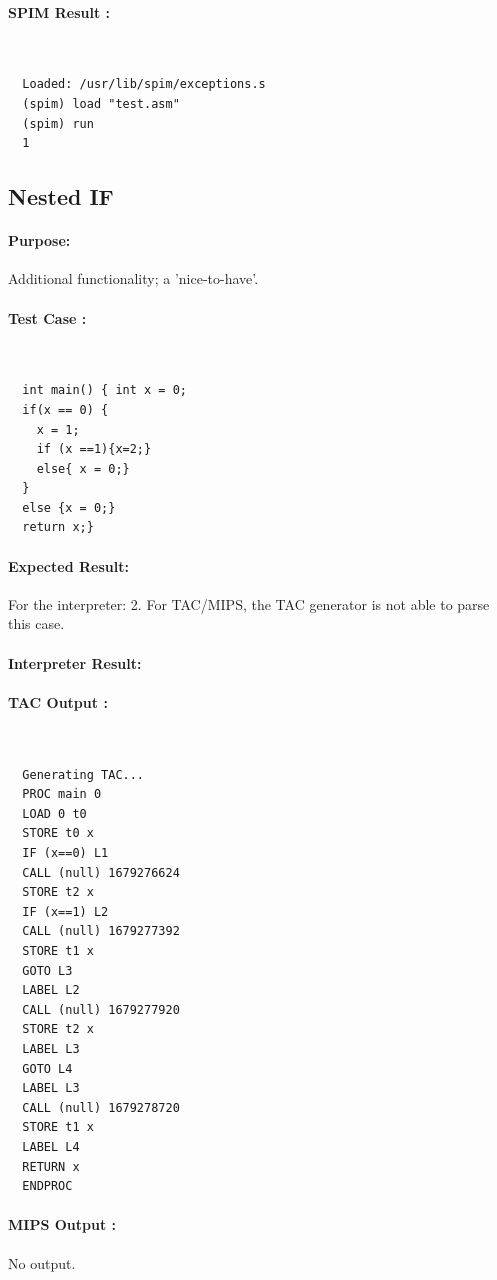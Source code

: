 \documentclass[12pt]{article}
\begin{document}
\paragraph{SPIM Result :}~\\
\begin{lstlisting}
  Loaded: /usr/lib/spim/exceptions.s
  (spim) load "test.asm"
  (spim) run
  1
\end{lstlisting}
\subsection{Nested IF}
\paragraph{Purpose:} Additional functionality; a 'nice-to-have'. 
\paragraph{Test Case :}~\\
\begin{lstlisting}
  int main() { int x = 0; 
  if(x == 0) { 
    x = 1;
    if (x ==1){x=2;} 
    else{ x = 0;}
  }
  else {x = 0;} 
  return x;}
\end{lstlisting}
\paragraph{Expected Result:} For the interpreter: 2. For TAC/MIPS, the TAC generator is not able to parse this case. 
\paragraph{Interpreter Result:}
\paragraph{TAC Output : }~\\
\begin{lstlisting}
  Generating TAC...
  PROC main 0
  LOAD 0 t0
  STORE t0 x
  IF (x==0) L1
  CALL (null) 1679276624
  STORE t2 x
  IF (x==1) L2
  CALL (null) 1679277392
  STORE t1 x
  GOTO L3
  LABEL L2
  CALL (null) 1679277920
  STORE t2 x
  LABEL L3
  GOTO L4
  LABEL L3
  CALL (null) 1679278720
  STORE t1 x
  LABEL L4
  RETURN x
  ENDPROC
\end{lstlisting}
\paragraph{MIPS Output : }No output.
\end{document}
